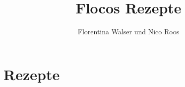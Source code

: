 \documentclass[
    a4paper,
    11pt
]{article}
\begin{document}
    \title{Flocos Rezepte}
    \author{Florentina Walser und Nico Roos}
    \maketitle


    \tableofcontents

    \vspace{5em}

    \section{Rezepte}
    \blindtext

    
\end{document}
